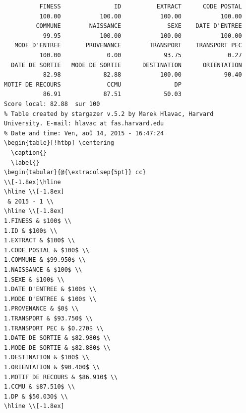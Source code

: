 \documentclass[]{article}
\begin{document}
\begin{verbatim}
          FINESS               ID          EXTRACT      CODE POSTAL 
          100.00           100.00           100.00           100.00 
         COMMUNE        NAISSANCE             SEXE    DATE D'ENTREE 
           99.95           100.00           100.00           100.00 
   MODE D'ENTREE       PROVENANCE        TRANSPORT    TRANSPORT PEC 
          100.00             0.00            93.75             0.27 
  DATE DE SORTIE   MODE DE SORTIE      DESTINATION      ORIENTATION 
           82.98            82.88           100.00            90.40 
MOTIF DE RECOURS             CCMU               DP 
           86.91            87.51            50.03 
Score local: 82.88  sur 100
% Table created by stargazer v.5.2 by Marek Hlavac, Harvard University. E-mail: hlavac at fas.harvard.edu
% Date and time: Ven, aoû 14, 2015 - 16:47:24
\begin{table}[!htbp] \centering 
  \caption{} 
  \label{} 
\begin{tabular}{@{\extracolsep{5pt}} cc} 
\\[-1.8ex]\hline 
\hline \\[-1.8ex] 
 & 2015 - 1 \\ 
\hline \\[-1.8ex] 
1.FINESS & $100$ \\ 
1.ID & $100$ \\ 
1.EXTRACT & $100$ \\ 
1.CODE POSTAL & $100$ \\ 
1.COMMUNE & $99.950$ \\ 
1.NAISSANCE & $100$ \\ 
1.SEXE & $100$ \\ 
1.DATE D'ENTREE & $100$ \\ 
1.MODE D'ENTREE & $100$ \\ 
1.PROVENANCE & $0$ \\ 
1.TRANSPORT & $93.750$ \\ 
1.TRANSPORT PEC & $0.270$ \\ 
1.DATE DE SORTIE & $82.980$ \\ 
1.MODE DE SORTIE & $82.880$ \\ 
1.DESTINATION & $100$ \\ 
1.ORIENTATION & $90.400$ \\ 
1.MOTIF DE RECOURS & $86.910$ \\ 
1.CCMU & $87.510$ \\ 
1.DP & $50.030$ \\ 
\hline \\[-1.8ex] 

\end{verbatim}
\end{document}
